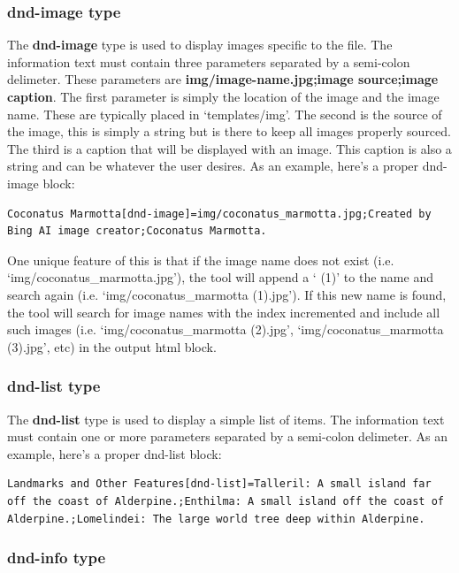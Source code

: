 \subsubsection{dnd-image type}

The \textbf{dnd-image} type is used to display images specific to the file. The information text must contain three parameters separated by a semi-colon delimeter. These parameters are \textbf{img/image-name.jpg;image source;image caption}. The first parameter is simply the location of the image and the image name. These are typically placed in `templates/img'. The second is the source of the image, this is simply a string but is there to keep all images properly sourced. The third is a caption that will be displayed with an image. This caption is also a string and can be whatever the user desires. As an example, here's a proper dnd-image block:

\begin{lstlisting}
Coconatus Marmotta[dnd-image]=img/coconatus_marmotta.jpg;Created by Bing AI image creator;Coconatus Marmotta.
\end{lstlisting}

One unique feature of this is that if the image name does not exist (i.e. `img/coconatus_marmotta.jpg'), the tool will append a ` (1)' to the name and search again (i.e. `img/coconatus_marmotta (1).jpg'). If this new name is found, the tool will search for image names with the index incremented and include all such images (i.e. `img/coconatus_marmotta (2).jpg', `img/coconatus_marmotta (3).jpg', etc) in the output html block.  

\subsubsection{dnd-list type}

The \textbf{dnd-list} type is used to display a simple list of items. The information text must contain one or more parameters separated by a semi-colon delimeter. As an example, here's a proper dnd-list block:

\begin{lstlisting}
Landmarks and Other Features[dnd-list]=Talleril: A small island far off the coast of Alderpine.;Enthilma: A small island off the coast of Alderpine.;Lomelindei: The large world tree deep within Alderpine.
\end{lstlisting}

\subsubsection{dnd-info type}

